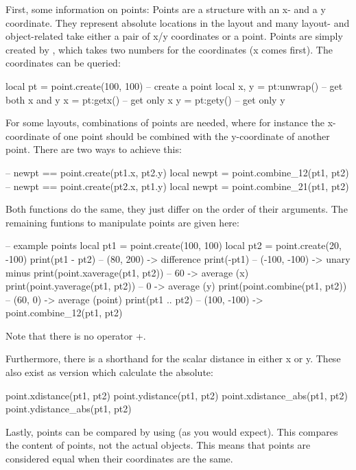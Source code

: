 First, some information on points:
Points are a structure with an x- and a y coordinate.
They represent absolute locations in the layout and many layout- and object-related take either a pair of x/y coordinates or a point.
Points are simply created by , which takes two numbers for the coordinates (x comes first).
The coordinates can be queried:
\begin{lualisting}
    local pt = point.create(100, 100) -- create a point
    local x, y = pt:unwrap() -- get both x and y
    x = pt:getx() -- get only x
    y = pt:gety() -- get only y
\end{lualisting}
For some layouts, combinations of points are needed, where for instance the x-coordinate of one point should be combined with the y-coordinate of another point.
There are two ways to achieve this:
\begin{lualisting}
    -- newpt == point.create(pt1.x, pt2.y)
    local newpt = point.combine_12(pt1, pt2)
    -- newpt == point.create(pt2.x, pt1.y)
    local newpt = point.combine_21(pt1, pt2)
\end{lualisting}
Both functions do the same, they just differ on the order of their arguments.
The remaining funtions to manipulate points are given here:
\begin{lualisting}
    -- example points
    local pt1 = point.create(100, 100)
    local pt2 = point.create(20, -100)
    print(pt1 - pt2)  -- (80, 200)    -> difference
    print(-pt1)       -- (-100, -100) -> unary minus
    print(point.xaverage(pt1, pt2)) -- 60 -> average (x)
    print(point.yaverage(pt1, pt2)) -- 0 -> average (y)
    print(point.combine(pt1, pt2)) -- (60, 0) -> average (point)
    print(pt1 ..
pt2) -- (100, -100)  -> point.combine_12(pt1, pt2)
\end{lualisting}
Note that there is no operator +.

Furthermore, there is a shorthand for the scalar distance in either x or y.
These also exist as version which calculate the absolute:
\begin{lualisting}
    point.xdistance(pt1, pt2)
    point.ydistance(pt1, pt2)
    point.xdistance_abs(pt1, pt2)
    point.ydistance_abs(pt1, pt2)
\end{lualisting}

Lastly, points can be compared by using \luainline{==} (as you would expect).
This compares the content of points, not the actual objects.
This means that points are considered equal when their coordinates are the same.

